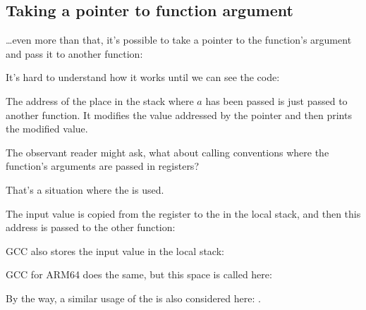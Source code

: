 \subsection{Taking a pointer to function argument}
\label{pointer_to_argument}

\dots even more than that, it's possible to take a pointer to the function's argument and pass
it to another function:



It's hard to understand how it works until we can see the code:



The address of the place in the stack where $a$ has been passed is just passed to another function.
It modifies the value addressed by the pointer and then \printf prints the modified value.

\par The observant reader might ask, what about calling conventions where the function's arguments are
passed in registers?

That's a situation where the  is used.

The input value is copied from the register
to the  in the local stack, and then this address is passed to the other function:



GCC also stores the input value in the local stack:



GCC for ARM64 does the same, but this space is called  here:



By the way, a similar usage of the  is also considered here: .


